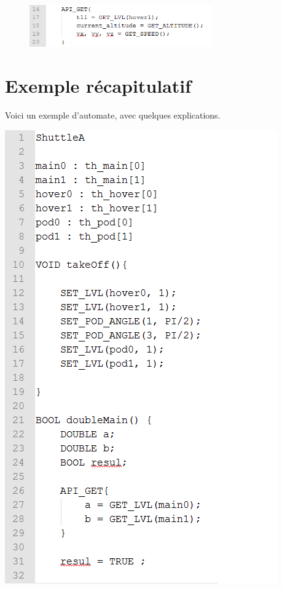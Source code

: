 \documentclass[a4paper,11pt]{article}
\begin{document}
\begin{figure}[!h]
            \begin{center}
                \includegraphics[width=0.7\textwidth]{img/apiget.png}
            \end{center}
\end{figure}

\section{Exemple récapitulatif}

Voici un exemple d'automate, avec quelques explications.
\begin{center}
	\includegraphics[scale=0.75]{img/otto1.png}
\end{center}
\end{document}
